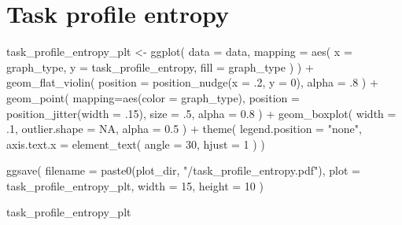 \documentclass[
]{book}
\newenvironment{Shaded}{\begin{snugshade}}{\end{snugshade}}
\newcommand{\AttributeTok}[1]{\textcolor[rgb]{0.77,0.63,0.00}{#1}}
\newcommand{\ConstantTok}[1]{\textcolor[rgb]{0.00,0.00,0.00}{#1}}
\newcommand{\DecValTok}[1]{\textcolor[rgb]{0.00,0.00,0.81}{#1}}
\newcommand{\FloatTok}[1]{\textcolor[rgb]{0.00,0.00,0.81}{#1}}
\newcommand{\FunctionTok}[1]{\textcolor[rgb]{0.00,0.00,0.00}{#1}}
\newcommand{\NormalTok}[1]{#1}
\newcommand{\OtherTok}[1]{\textcolor[rgb]{0.56,0.35,0.01}{#1}}
\newcommand{\SpecialCharTok}[1]{\textcolor[rgb]{0.00,0.00,0.00}{#1}}
\newcommand{\StringTok}[1]{\textcolor[rgb]{0.31,0.60,0.02}{#1}}
\begin{document}
\hypertarget{task-profile-entropy}{%
\section{Task profile entropy}\label{task-profile-entropy}}

\begin{Shaded}
\begin{Highlighting}[]
\NormalTok{task\_profile\_entropy\_plt }\OtherTok{\textless{}{-}} \FunctionTok{ggplot}\NormalTok{(}
    \AttributeTok{data =}\NormalTok{ data,}
    \AttributeTok{mapping =} \FunctionTok{aes}\NormalTok{(}
      \AttributeTok{x =}\NormalTok{ graph\_type,}
      \AttributeTok{y =}\NormalTok{ task\_profile\_entropy,}
      \AttributeTok{fill =}\NormalTok{ graph\_type}
\NormalTok{    )}
\NormalTok{  ) }\SpecialCharTok{+}
  \FunctionTok{geom\_flat\_violin}\NormalTok{(}
    \AttributeTok{position =} \FunctionTok{position\_nudge}\NormalTok{(}\AttributeTok{x =}\NormalTok{ .}\DecValTok{2}\NormalTok{, }\AttributeTok{y =} \DecValTok{0}\NormalTok{),}
    \AttributeTok{alpha =}\NormalTok{ .}\DecValTok{8}
\NormalTok{  ) }\SpecialCharTok{+}
  \FunctionTok{geom\_point}\NormalTok{(}
    \AttributeTok{mapping=}\FunctionTok{aes}\NormalTok{(}\AttributeTok{color =}\NormalTok{ graph\_type),}
    \AttributeTok{position =} \FunctionTok{position\_jitter}\NormalTok{(}\AttributeTok{width =}\NormalTok{ .}\DecValTok{15}\NormalTok{),}
    \AttributeTok{size =}\NormalTok{ .}\DecValTok{5}\NormalTok{,}
    \AttributeTok{alpha =} \FloatTok{0.8}
\NormalTok{  ) }\SpecialCharTok{+}
  \FunctionTok{geom\_boxplot}\NormalTok{(}
    \AttributeTok{width =}\NormalTok{ .}\DecValTok{1}\NormalTok{,}
    \AttributeTok{outlier.shape =} \ConstantTok{NA}\NormalTok{,}
    \AttributeTok{alpha =} \FloatTok{0.5}
\NormalTok{  ) }\SpecialCharTok{+}
  \FunctionTok{theme}\NormalTok{(}
    \AttributeTok{legend.position =} \StringTok{"none"}\NormalTok{,}
    \AttributeTok{axis.text.x =} \FunctionTok{element\_text}\NormalTok{(}
      \AttributeTok{angle =} \DecValTok{30}\NormalTok{,}
      \AttributeTok{hjust =} \DecValTok{1}
\NormalTok{    )}
\NormalTok{  )}

\FunctionTok{ggsave}\NormalTok{(}
  \AttributeTok{filename =} \FunctionTok{paste0}\NormalTok{(plot\_dir, }\StringTok{"/task\_profile\_entropy.pdf"}\NormalTok{),}
  \AttributeTok{plot =}\NormalTok{ task\_profile\_entropy\_plt,}
  \AttributeTok{width =} \DecValTok{15}\NormalTok{,}
  \AttributeTok{height =} \DecValTok{10}
\NormalTok{)}

\NormalTok{task\_profile\_entropy\_plt}
\end{Highlighting}
\end{Shaded}
\end{document}
